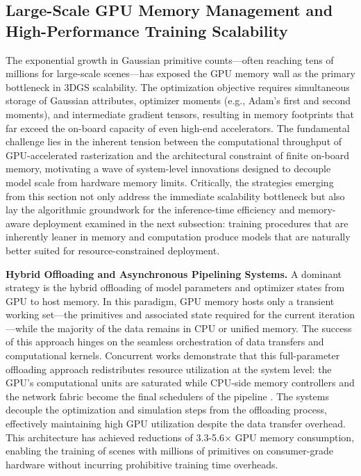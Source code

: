 \documentclass[11pt,a4paper]{article}
\begin{document}
\subsection{Large-Scale GPU Memory Management and High-Performance Training Scalability}


The exponential growth in Gaussian primitive counts---often reaching tens of millions for large-scale scenes---has exposed the GPU memory wall as the primary bottleneck in 3DGS scalability. The optimization objective requires simultaneous storage of Gaussian attributes, optimizer moments (e.g., Adam's first and second moments), and intermediate gradient tensors, resulting in memory footprints that far exceed the on-board capacity of even high-end accelerators. The fundamental challenge lies in the inherent tension between the computational throughput of GPU-accelerated rasterization and the architectural constraint of finite on-board memory, motivating a wave of system-level innovations designed to decouple model scale from hardware memory limits. Critically, the strategies emerging from this section not only address the immediate scalability bottleneck but also lay the algorithmic groundwork for the inference-time efficiency and memory-aware deployment examined in the next subsection: training procedures that are inherently leaner in memory and computation produce models that are naturally better suited for resource-constrained deployment.

\textbf{Hybrid Offloading and Asynchronous Pipelining Systems.} A dominant strategy is the hybrid offloading of model parameters and optimizer states from GPU to host memory. In this paradigm, GPU memory hosts only a transient working set---the primitives and associated state required for the current iteration---while the majority of the data remains in CPU or unified memory. The success of this approach hinges on the seamless orchestration of data transfers and computational kernels. Concurrent works demonstrate that this full-parameter offloading approach redistributes resource utilization at the system level: the GPU's computational units are saturated while CPU-side memory controllers and the network fabric become the final schedulers of the pipeline \cite{arxiv:2410.23213v1}. The systems decouple the optimization and simulation steps from the offloading process, effectively maintaining high GPU utilization despite the data transfer overhead. This architecture has achieved reductions of 3.3-5.6$\times$ GPU memory consumption, enabling the training of scenes with millions of primitives on consumer-grade hardware without incurring prohibitive training time overheads.
\end{document}
